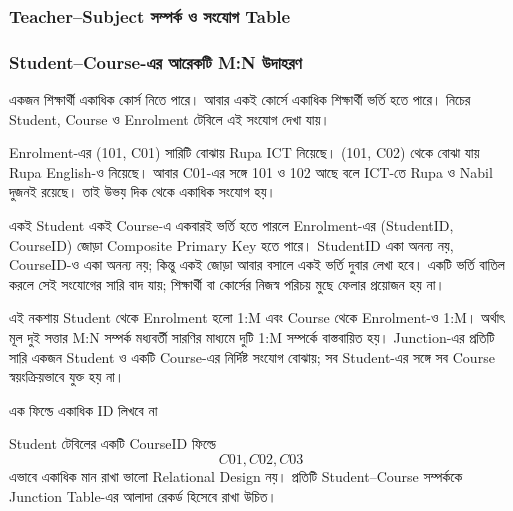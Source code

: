 \subsubsection{Teacher--Subject সম্পর্ক ও সংযোগ Table}


\subsubsection{Student--Course-এর আরেকটি M:N উদাহরণ}

একজন শিক্ষার্থী একাধিক কোর্স নিতে পারে। আবার একই কোর্সে একাধিক শিক্ষার্থী ভর্তি হতে পারে। নিচের Student, Course ও Enrolment টেবিলে এই সংযোগ দেখা যায়।




Enrolment-এর (101, C01) সারিটি বোঝায় Rupa ICT নিয়েছে। (101, C02) থেকে
বোঝা যায় Rupa English-ও নিয়েছে। আবার C01-এর সঙ্গে 101 ও 102 আছে বলে
ICT-তে Rupa ও Nabil দুজনই রয়েছে। তাই উভয় দিক থেকে একাধিক সংযোগ হয়।


একই Student একই Course-এ একবারই ভর্তি হতে পারলে Enrolment-এর (StudentID, CourseID) জোড়া Composite Primary Key হতে পারে। StudentID একা অনন্য নয়, CourseID-ও একা অনন্য নয়; কিন্তু একই জোড়া আবার বসালে একই ভর্তি দুবার লেখা হবে। একটি ভর্তি বাতিল করলে সেই সংযোগের সারি বাদ যায়; শিক্ষার্থী বা কোর্সের নিজস্ব পরিচয় মুছে ফেলার প্রয়োজন হয় না।

এই নকশায় Student থেকে Enrolment হলো 1:M এবং Course থেকে Enrolment-ও 1:M। অর্থাৎ মূল দুই সত্তার M:N সম্পর্ক মধ্যবর্তী সারণির মাধ্যমে দুটি 1:M সম্পর্কে বাস্তবায়িত হয়। Junction-এর প্রতিটি সারি একজন Student ও একটি Course-এর নির্দিষ্ট সংযোগ বোঝায়; সব Student-এর সঙ্গে সব Course স্বয়ংক্রিয়ভাবে যুক্ত হয় না।

\begin{mistakebox}{এক ফিল্ডে একাধিক ID লিখবে না}

Student টেবিলের একটি CourseID ফিল্ডে \[
C01,C02,C03
\] এভাবে একাধিক মান রাখা ভালো Relational Design নয়। প্রতিটি Student--Course সম্পর্ককে Junction Table-এর আলাদা রেকর্ড
হিসেবে রাখা উচিত।

\end{mistakebox}




